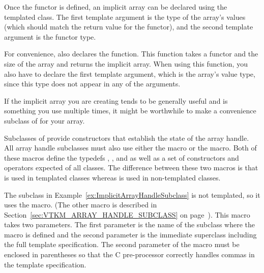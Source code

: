
Once the functor is defined, an implicit array can be declared using the
templated  class. The first template argument
is the type of the array's values (which should match the return value for
the functor), and the second template argument is the functor type.


For convenience,  also
declares the  function. This function
takes a functor and the size of the array and returns the implicit array.
When using this function, you also have to declare the first template
argument, which is the array's value type, since this type does not appear
in any of the arguments.



If the implicit array you are creating tends to be generally useful and is
something you use multiple times, it might be worthwhile to make a
convenience subclass of  for your array.


Subclasses of  provide constructors that
establish the state of the array handle. All array handle subclasses must
also use either the  macro or the
 macro. Both of these macros
define the typedefs , , and
 as well as a set of constructors and operators
expected of all  classes. The difference
between these two macros is that 
is used in templated classes whereas
 is used in non-templated
classes.

The  subclass in
Example~\ref{ex:ImplicitArrayHandleSubclass} is not templated, so it uses
the  macro. (The other macro
is described in Section~\ref{sec:VTKM_ARRAY_HANDLE_SUBCLASS} on
page~\pageref{sec:VTKM_ARRAY_HANDLE_SUBCLASS}). This macro takes two
parameters. The first parameter is the name of the subclass where the macro
is defined and the second parameter is the immediate superclass including
the full template specification. The second parameter of the macro must be
enclosed in parentheses so that the C pre-processor correctly handles
commas in the template specification.

